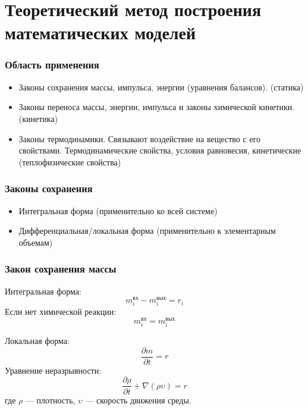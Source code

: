 	\section{Теоретический метод построения математических моделей}
	
\begin{frame}
	\frametitle{Область применения}
	\begin{itemize}
	\item Законы сохранения массы, импульса, энергии (уравнения балансов). (статика)
	\item Законы переноса массы, энергии, импульса и законы химической кинетики. (кинетика)
	\item Законы термодинамики. Связывают воздействие на вещество с его свойствами. Термодинамические свойства, условия равновесия, кинетические (теплофизические свойства)
	\end{itemize}
\end{frame}

\begin{frame}
\frametitle{Законы сохранения}
\begin{itemize}
	\item Интегральная форма (применительно ко всей системе)
	\item Дифференциальная/локальная форма (применительно к элементарным объемам)
\end{itemize}
\end{frame}


\begin{frame}
\frametitle{Закон сохранения массы}
Интегральная форма:
\begin{equation}
	m_i^{вх} - m_i^{вых} =r_i
\end{equation}
Если нет химической реакции:
\begin{equation}
m_i^{вх} = m_i^{вых} 
\end{equation}

Локальная форма:
\begin{equation}
	\dfrac{\partial m} {\partial t} =r
\end{equation}
Уравнение неразрывности:
\begin{equation}
\dfrac{\partial \rho} {\partial t} + \nabla(\rho \upsilon) =r
\end{equation}
где $\rho$ --- плотность, $\upsilon$ --- скорость движения среды.


\end{frame}

